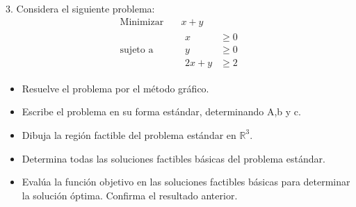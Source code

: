 \documentclass{article}
\begin{document}
3. Considera el siguiente problema:
\begin{equation*}
  \begin{aligned}
    \text{Minimizar}\quad & x+y \\
    \text{sujeto a}\quad &
    \begin{aligned}
      x & \geq 0\\
      y & \geq 0\\
      2x+y & \geq 2
      \end{aligned}    
   \end{aligned}
 \end{equation*}
 \begin{itemize}
 \item Resuelve el problema por el método gráfico.
 \item Escribe el problema en su forma estándar, determinando A,b y c.
 \item Dibuja la región factible del problema estándar en  $\mathbb{R}^3$.
 \item Determina todas las soluciones factibles básicas del problema estándar.
   \item Evalúa la función objetivo en las soluciones factibles básicas para determinar la solución óptima. Confirma el resultado anterior.
\end{itemize}
\end{document}
